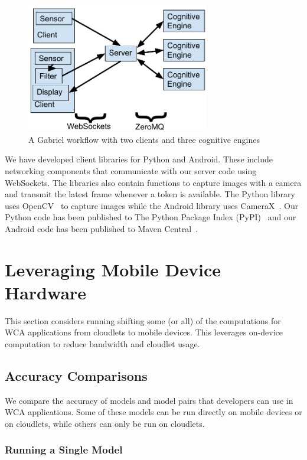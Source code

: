\begin{figure}[h!]
  \includegraphics[width=8cm]{figures/runtime_architecture.pdf}
  \caption{A Gabriel workflow with two clients and three cognitive engines
  }\label{fig:runtime_architecture}
\end{figure}

We have developed client libraries for Python and Android. These include
networking components that communicate with our server code using WebSockets.
The libraries also contain functions to capture images with a camera and
transmit the latest frame whenever a token is available. The Python library uses
OpenCV~\cite{opencv_library} to capture images while the Android library uses
CameraX~\cite{camerax}. Our Python code has been published to The Python Package
Index (PyPI)~\cite{server_gabriel, python_gabriel_client} and our Android code
has been published to Maven Central~\cite{android_gabriel_client}.

\section{Leveraging Mobile Device Hardware}

This section considers running shifting some (or all) of the computations for
WCA applications from cloudlets to mobile devices.
This leverages on-device computation to reduce bandwidth and cloudlet usage.

\subsection{Accuracy Comparisons}

We compare the accuracy of models and model pairs that developers can use in WCA
applications.
Some of these models can be run directly on mobile devices or on cloudlets,
while others can only be run on cloudlets.

\subsubsection{Running a Single Model}\label{sec:single_model}

